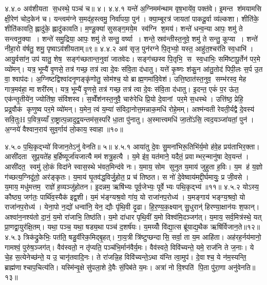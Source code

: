 ४.४.०
अव॑शीयता स॒धस्थे॒ पञ्च॑ च॥ ४।
४.४.१
यन्ते॑ अ॒ग्निमम॑न्थाम वृष॒भाये॑व॒ पक्त॑वे। इ॒मन्त श॑मयामसि क्षी॒रेण॑ चोद॒केन॑ च। यन्त्वम॑ग्ने स॒मद॑ह॒स्त्वमु॒ निर्वा॑पया॒ पुन॑। क्या॒म्बूरत्र॑ जायतां पाकदू॒र्वा व्य॑ल्कशा। शीति॑के॒ शीति॑कावति॒ ह्लादु॑के॒ ह्लादु॑कावति। म॒ण्डू॒क्या॑ सुसङ्ग॒मये॒म स्व॑ग्नि श॒मय॑। शन्ते॑ धन्व॒न्या आपः॒ शमु॑ ते सन्त्वनू॒क्या। शन्ते॑ समु॒द्रिया॒ आपः॒ शमु॑ ते सन्तु॒ वर्ष्या। शन्ते॒ स्रव॑न्तीस्त॒नुवे॒ शमु॑ ते सन्तु॒ कूप्या। शन्ते॑ नीहा॒रो व॑र्\mbox{}षतु॒ शमु॒ पृष्वाऽव॑शीयताम्॥९॥
४.४.२
अव॑ सृज॒ पुन॑रग्ने पि॒तृभ्यो॒ यस्त॒ आहु॑त॒श्चर॑ति स्व॒धाभि॑। आयु॒र्वसा॑न॒ उप॑ यातु॒ शेष॒ सङ्ग॑च्छतान्त॒नुवा॑ जातवेदः। सङ्ग॑च्छस्व पि॒तृभि॒ स स्व॒धाभिः॒ समि॑ष्टापू॒र्तेन॑ पर॒मे व्यो॑मन्। यत्र॒ भूम्यै॑ वृ॒णसे॒ तत्र॑ गच्छ॒ तत्र॑ त्वा दे॒वः स॑वि॒ता द॑धातु। यत्ते॑ कृ॒ष्णः  श॑कु॒न आ॑तु॒तोद॑ पिपी॒लः स॒र्प उ॒त वा॒ श्वाप॑दः। अ॒ग्निष्टद्विश्वा॑दनृ॒णङ्कृ॑णोतु॒ सोम॑श्च॒ यो ब्राह्म॒णमा॑वि॒वेश॑। उत्ति॒ष्ठात॑स्त॒नुव॒ सम्भ॑रस्व॒ मेह गात्र॒मव॑हा॒ मा शरी॑रम्। यत्र॒ भूम्यै॑ वृ॒णसे॒ तत्र॑ गच्छ॒ तत्र॑ त्वा दे॒वः स॑वि॒ता द॑धातु। इ॒दन्त॒ एकं॑ प॒र ऊ॑त॒ एक॑न्तृ॒तीये॑न॒ ज्योति॑षा॒ संवि॑शस्व। स॒व्वेँश॑नस्त॒नुवै॒ चारु॑रेधि प्रि॒यो दे॒वानां पर॒मे स॒धस्थे। उत्ति॑ष्ठ॒ प्रेहि॒ प्रद्र॒वौक॑ कृणुष्व पर॒मे व्यो॑मन्। य॒मेन॒ त्वं य॒म्या॑ संविदा॒नोत्त॒मन्नाक॒मधि॑ रोहे॒मम्। अश्म॑न्वती रेवती॒र्यद्वै दे॒वस्य॑ सवि॒तुःH प॒वित्र॒य्याँ रा॒ष्ट्रात्प॒न्नादुद्व॒यन्तम॑स॒स्परि॑ धा॒ता पु॑नातु। अ॒स्मात्त्वमधि॑ जा॒तो॑ऽसि॒ त्वद॒यञ्जा॑यतां॒ पुन॑। अ॒ग्नये॑ वैश्वान॒राय॑ सुव॒र्गाय॑ लो॒काय॒ स्वाहा॥१०॥
\anuvakamend

४.५.०
प॒थि॒कृद्भ्यो॑ विजान॒तेऽनु॑ वेनति॥ ५॥
४.५.१
आया॑तु दे॒वः सु॒मना॑भिरू॒तिभि॑र्य॒मो ह॑वे॒ह प्रय॑ताभिर॒क्ता। आसी॑दता सुप्र॒यते॑ह ब॒र्\mbox{}हिष्यूर्जा॑यजात्यै मम॑ शत्रु॒हत्यै। य॒मे इ॑व॒ यत॑माने॒ यदैतं॒ प्रवाम्भर॒न्मानु॑षा देव॒यन्त॑। आसी॑दत॒ स्वमु॑ लो॒कं  विदा॑ने स्वास॒स्थे भ॑वत॒मिन्द॑वे नः। य॒माय॒ सोम सुनुत य॒माय॑ जुहुता ह॒विः। य॒म ह॑ य॒ज्ञो ग॑च्छत्य॒ग्निदू॑तो॒ अर॑ङ्कृतः। य॒माय॑ घृ॒तव॑द्ध॒विर्जु॒होत॒ प्र च॑ तिष्ठत। स नो॑ दे॒वेष्वाय॑मद्दी॒र्घमायुः॒ प्र जी॒वसे। य॒माय॒ मधु॑मत्तम॒ राज्ञे॑ ह॒व्यञ्जु॑होतन। इ॒दन्नम॒ ऋषि॑भ्यः पूर्व॒जेभ्यः॒ पूर्वेभ्यः पथि॒कृद्भ्य॑॥११॥
४.५.२
योऽस्य॒ कौष्ठ्य॒ जग॑तः॒ पार्थि॑व॒स्यैक॑ इद्व॒शी। य॒मं भ॑ङ्ग्यश्र॒वो गा॑य॒ यो राजा॑नप॒रोध्य॑। य॒मङ्गाय॑ भङ्ग्य॒श्रवो॒ यो राजा॑नप॒रोध्य॑। येना॒पो न॒द्यो॑ धन्वा॑नि॒ येन॒ द्यौः पृ॑थि॒वी दृ॒ढा। हि॒र॒ण्य॒क॒क्ष्यान् सु॒धुरान्॑ हिरण्या॒क्षान॑यः  श॒फान्। अश्वा॑न॒नश्य॑तो दा॒नं॒ य॒मो रा॑जाभि॒ तिष्ठ॑ति। य॒मो दा॑धार पृथि॒वीं य॒मो विश्व॑मि॒दञ्जग॑त्। य॒माय॒ सर्व॒मित्र॑स्थे॒ यत् प्रा॒णद्वा॒युर॑क्षि॒तम्। यथा॒ पञ्च॒ यथा॒ षड्य॒था पञ्च॑ द॒शर्\mbox{}ष॑यः। य॒मय्योँ वि॑द्या॒त्स ब्रू॑याद्य॒थैक ऋषि॑र्विजान॒ते॥१२॥
४.५.३
त्रिक॑द्रुकेभिः॒ पत॑ति॒ षडु॒र्वीरेक॒मिद्बृ॒हत्। गा॒य॒त्री त्रि॑ष्टुप्छन्दासि॒ सर्वा॒ ता य॒म आहि॑ता। अह॑रह॒र्नय॑मानो॒ गामश्वं॒ पुरु॑ष॒ञ्जग॑त्। वैव॑स्वतो॒ न तृ॑प्यति॒ पञ्च॑भि॒र्मान॑वैर्य॒मः। वैव॑स्वते॒ विवि॑च्यन्ते॒ यमे॒ राज॑नि ते ज॒नाः। ये चे॒ह स॒त्येनेच्छ॑न्ते॒ य उ॒ चानृ॑तवादि॒नः। ते रा॑जन्नि॒ह विवि॑च्यन्ते॒ऽथा य॑न्ति त्वा॒मुप॑। दे॒वाश्च॒ ये न॑म॒स्यन्ति॒ ब्राह्म॑णाश्चाप॒चित्य॑ति। यस्मि॑न्वृ॒क्षे सु॑पला॒शे दे॒वैः सं॒पिब॑ते य॒मः। अत्रा॑ नो वि॒श्पति॑ पि॒ता पु॑रा॒णा अनु॑वेनति॥१३॥
\anuvakamend

